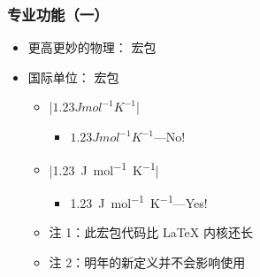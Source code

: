 \begin{frame}[fragile]
\frametitle{专业功能（一）}
\begin{itemize}
  \item 更高更妙的物理： 宏包
     \pause
  \item 国际单位： 宏包
    \begin{itemize}
      \item |$1.23 J mol^{-1} K^{-1}$|
        \begin{itemize}
          \item $1.23 J mol^{-1} K^{-1}$---No!
        \end{itemize}
      \item |\SI{1.23}{J.mol^{-1}.K^{-1}}|
        \begin{itemize}
          \item \SI{1.23}{J.mol^{-1}.K^{-1}}---Yes!
        \end{itemize} \pause
      \item 注 1：此宏包代码比 \LaTeX{} 内核还长 \pause
      \item 注 2：明年的新定义并不会影响使用
    \end{itemize}
\end{itemize}
\end{frame}


